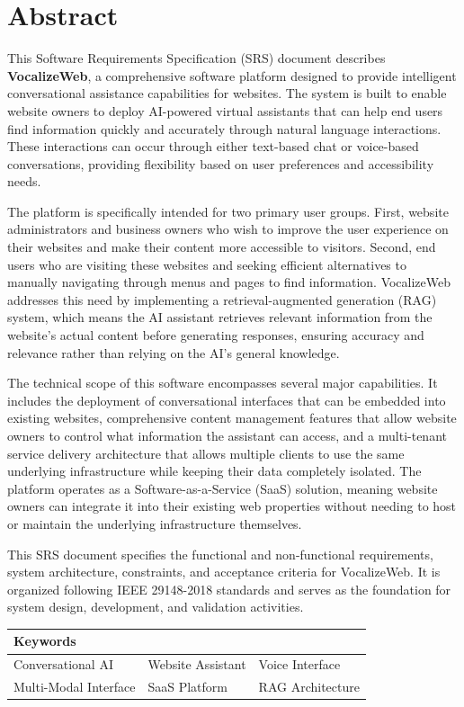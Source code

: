 
\chapter*{Abstract}

\vspace{0.3cm}

This Software Requirements Specification (SRS) document describes \textbf{VocalizeWeb}, a comprehensive software platform designed to provide intelligent conversational assistance capabilities for websites. The system is built to enable website owners to deploy AI-powered virtual assistants that can help end users find information quickly and accurately through natural language interactions. These interactions can occur through either text-based chat or voice-based conversations, providing flexibility based on user preferences and accessibility needs.

The platform is specifically intended for two primary user groups. First, website administrators and business owners who wish to improve the user experience on their websites and make their content more accessible to visitors. Second, end users who are visiting these websites and seeking efficient alternatives to manually navigating through menus and pages to find information. VocalizeWeb addresses this need by implementing a retrieval-augmented generation (RAG) system, which means the AI assistant retrieves relevant information from the website's actual content before generating responses, ensuring accuracy and relevance rather than relying on the AI's general knowledge.

The technical scope of this software encompasses several major capabilities. It includes the deployment of conversational interfaces that can be embedded into existing websites, comprehensive content management features that allow website owners to control what information the assistant can access, and a multi-tenant service delivery architecture that allows multiple clients to use the same underlying infrastructure while keeping their data completely isolated. The platform operates as a Software-as-a-Service (SaaS) solution, meaning website owners can integrate it into their existing web properties without needing to host or maintain the underlying infrastructure themselves.

This SRS document specifies the functional and non-functional requirements, system architecture, constraints, and acceptance criteria for VocalizeWeb. It is organized following IEEE 29148-2018 standards and serves as the foundation for system design, development, and validation activities.

\vspace{0.5cm}

\begin{center}
\begin{tabular}{@{}lll@{}}
\toprule
\textbf{Keywords} & & \\
\midrule
Conversational AI & Website Assistant & Voice Interface \\
Multi-Modal Interface & SaaS Platform & RAG Architecture \\
\bottomrule
\end{tabular}
\end{center}

\newpage
